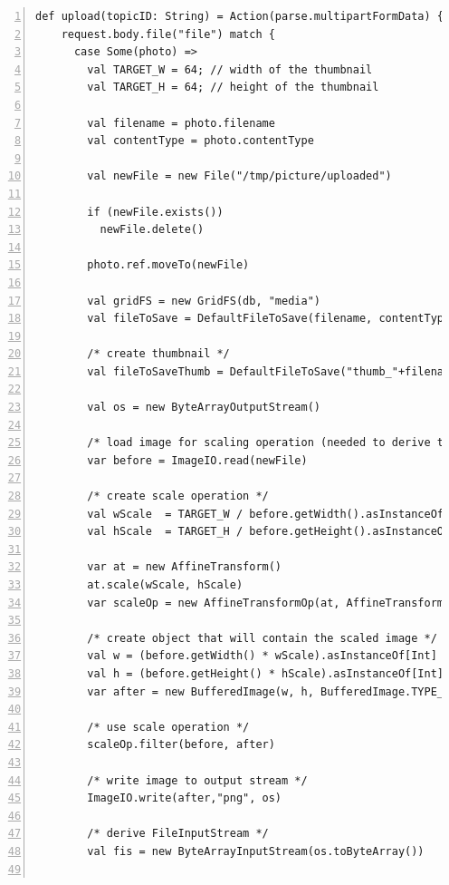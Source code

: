 \begin{lstlisting}[numbers=left,caption={Complete upload Action of the FileController},label=Scala:Upload:full,frame=tlbr,breaklines]
def upload(topicID: String) = Action(parse.multipartFormData) { request =>
    request.body.file("file") match {
      case Some(photo) =>
        val TARGET_W = 64; // width of the thumbnail
        val TARGET_H = 64; // height of the thumbnail

        val filename = photo.filename
        val contentType = photo.contentType

        val newFile = new File("/tmp/picture/uploaded")

        if (newFile.exists())
          newFile.delete()

        photo.ref.moveTo(newFile)

        val gridFS = new GridFS(db, "media")
        val fileToSave = DefaultFileToSave(filename, contentType)

        /* create thumbnail */
        val fileToSaveThumb = DefaultFileToSave("thumb_"+filename, contentType)

        val os = new ByteArrayOutputStream()

        /* load image for scaling operation (needed to derive thumbnail) */
        var before = ImageIO.read(newFile)

        /* create scale operation */
        val wScale  = TARGET_W / before.getWidth().asInstanceOf[Double]
        val hScale  = TARGET_H / before.getHeight().asInstanceOf[Double]

        var at = new AffineTransform()
        at.scale(wScale, hScale)
        var scaleOp = new AffineTransformOp(at, AffineTransformOp.TYPE_BILINEAR)

        /* create object that will contain the scaled image */
        val w = (before.getWidth() * wScale).asInstanceOf[Int]
        val h = (before.getHeight() * hScale).asInstanceOf[Int]
        var after = new BufferedImage(w, h, BufferedImage.TYPE_INT_ARGB)

        /* use scale operation */
        scaleOp.filter(before, after)

        /* write image to output stream */
        ImageIO.write(after,"png", os)

        /* derive FileInputStream */
        val fis = new ByteArrayInputStream(os.toByteArray())


\end{lstlisting}
